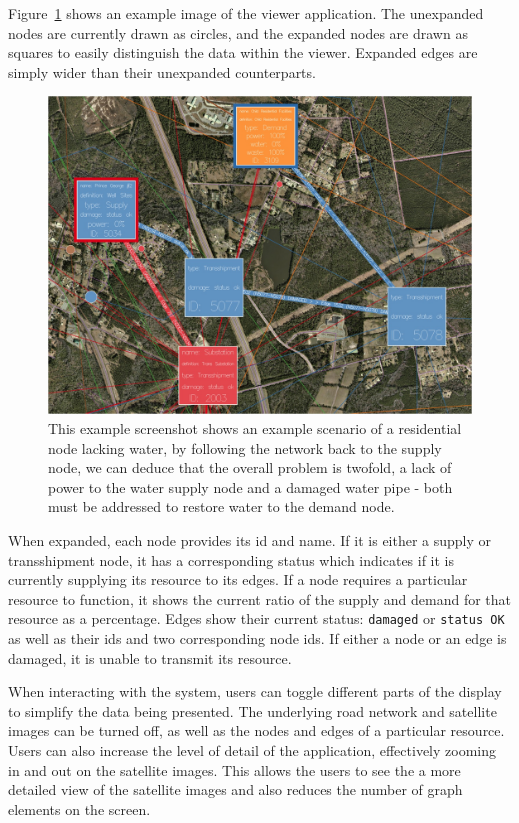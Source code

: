 Figure~\ref{fig:mapview_example} shows an example image of the viewer application. The unexpanded nodes are currently drawn as circles, and the expanded nodes are drawn as squares to easily distinguish the data within the viewer. Expanded edges are simply wider than their unexpanded counterparts.

\begin{figure}[htp] \centering
    \includegraphics[width=0.8\linewidth]{img/mapview_example.jpg}
    \caption[Example Infrastructure Visualization]{This example screenshot shows an example scenario of a residential node lacking water,
    by following the network back to the supply node, we can deduce that the overall problem is twofold, a lack of power
    to the water supply node and a damaged water pipe - both must be addressed to restore water to the demand node.}
    \label{fig:mapview_example}
\end{figure}

When expanded, each node provides its id and name. If it is either a supply or transshipment node, it has a
corresponding status which indicates if it is currently supplying its resource to its edges. If a node requires a particular resource to function, it shows the current ratio of the supply and demand for that resource as a percentage. Edges show their current status: {\tt damaged} or {\tt status OK} as well as their ids and two corresponding node ids. If either a node or an edge is damaged, it is unable to transmit its resource.

When interacting with the system, users can toggle different parts of the display to simplify the data being presented. The underlying road network and satellite images can be turned off, as well as the nodes and edges of a particular resource. Users can also increase the level of detail of the application, effectively zooming in and out on the satellite images. This allows the users to see the a more detailed view of the satellite images and also reduces the number of graph elements on the screen. 

